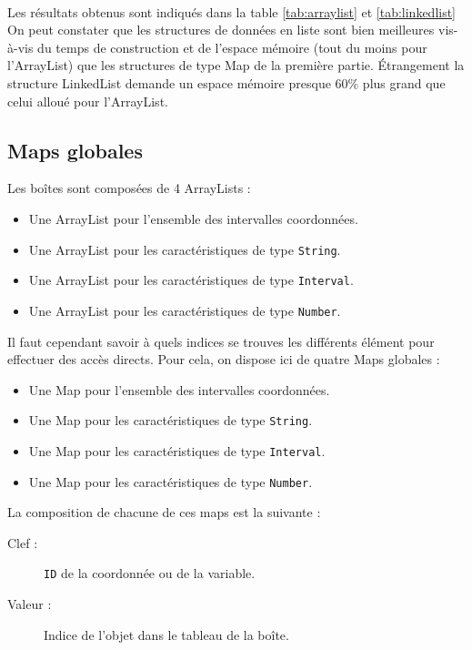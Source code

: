 \paragraph{}Les résultats obtenus sont indiqués dans la table \ref{tab:arraylist} et \ref{tab:linkedlist}
On peut constater que les structures de données en liste sont bien meilleures vis-à-vis du temps de construction et de l'espace mémoire (tout du moins pour l'ArrayList) que les structures de type Map de la première partie. Étrangement la structure LinkedList demande un espace mémoire presque 60\% plus grand que celui alloué pour l'ArrayList.


\subsection{Maps globales}
Les boîtes sont composées  de 4 ArrayLists : 
\begin{itemize}
  \item Une ArrayList pour l'ensemble des intervalles coordonnées.
  \item Une ArrayList pour les caractéristiques de type \verb+String+.
  \item Une ArrayList pour les caractéristiques de type \verb+Interval+.
  \item Une ArrayList pour les caractéristiques de type \verb+Number+.
\end{itemize}
Il faut cependant savoir à quels indices se trouves les différents élément pour effectuer des accès directs. Pour cela, on dispose ici de quatre Maps globales :
\begin{itemize}
  \item Une Map pour l'ensemble des intervalles coordonnées.
  \item Une Map pour les caractéristiques de type \verb+String+.
  \item Une Map pour les caractéristiques de type \verb+Interval+.
  \item Une Map pour les caractéristiques de type \verb+Number+.
\end{itemize}
La composition de chacune de ces maps est la suivante :  
\begin{description}
 \item[Clef :]
\verb+ID+ de la coordonnée ou de la variable.
\item[Valeur :]
Indice de l'objet dans le tableau de la boîte.
\end{description}



